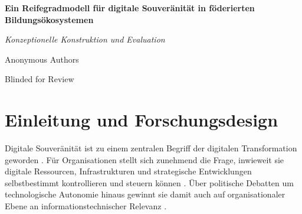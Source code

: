 \documentclass[10pt,a4paper]{article}
\begin{document}
\begin{center}
  {\Large\bfseries Ein Reifegradmodell für digitale Souveränität in föderierten Bildungsökosystemen\par}
  \vspace{0.4em}
  {\large\itshape Konzeptionelle Konstruktion und Evaluation\par}
  \vspace{1.0em}
  {\normalsize Anonymous Authors\par}
  {\footnotesize Blinded for Review\par}
  \vspace{1.0em}
\end{center}

\begin{abstract}
\noindent\textbf{Abstract:} Föderierte Bildungsökosysteme verbinden rechtlich eigenständige Institutionen über gemeinsame digitale Dienste und Dateninfrastrukturen. Dadurch entstehen technische und organisationale Abhängigkeiten, deren Auswirkungen auf die digitale Souveränität bislang nur unzureichend systematisch bewertbar sind. Der Beitrag entwickelt daher im Rahmen eines Design-Science-Research-Ansatzes ein Reifegradmodell zur organisationsübergreifenden Bewertung digitaler Souveränität. Auf Basis einer strukturierten Literaturrecherche, qualitativen Inhaltsanalyse und iterativen Taxonomieentwicklung werden sechs Dimensionen mit 18 Kriterien abgeleitet und in ein Self-Assessment mit einer sechsstufigen, nicht-kompensatorischen Bewertungslogik überführt. Eine szenariobasierte Demonstration und eine konzeptionelle Ex-ante-Evaluation zeigen, wie das Modell dimensionsbezogene Stärken, Schwächen und Entwicklungsfelder sichtbar macht. Das Artefakt bietet damit eine methodisch begründete Grundlage für die Steuerung digitaler Souveränität. Seine empirische Validierung in realen Bildungsverbünden steht noch aus.

\vspace{0.4em}
\noindent\textbf{Keywords:} Digitale Souveränität, Föderierte Bildungsökosysteme, Reifegradmodell, Design Science Research, IT-Governance
\end{abstract}

\vspace{0.5em}

\section{Einleitung und Forschungsdesign}

Digitale Souveränität ist zu einem zentralen Begriff der digitalen Transformation geworden \cite{Fr24}. Für Organisationen stellt sich zunehmend die Frage, inwieweit sie digitale Ressourcen, Infrastrukturen und strategische Entwicklungen selbstbestimmt kontrollieren und steuern können \cite{SHO24}. Über politische Debatten um technologische Autonomie hinaus gewinnt sie damit auch auf organisationaler Ebene an informationstechnischer Relevanz \cite{Ab24}.
\end{document}
